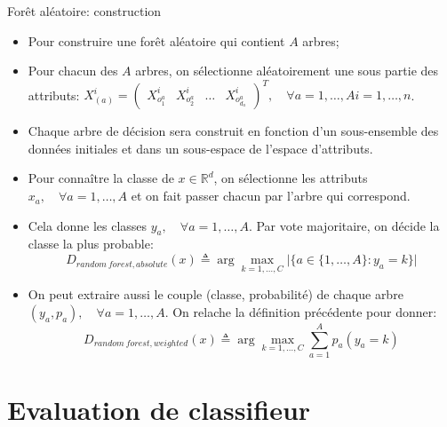 \documentclass[8pt]{beamer}
\begin{document}
				\begin{frame}{Forêt aléatoire: construction}
					\begin{itemize}
						\item<1-> Pour construire une forêt aléatoire qui contient \(A\) arbres;
						\item<2-> Pour chacun des \(A\) arbres, on sélectionne aléatoirement une sous partie des attributs: \(X^i_{(a)} = \begin{pmatrix}
							X^i_{o^a_1} & X^i_{o^a_2} & \dots & X^i_{o^a_{d_a}}
						\end{pmatrix}^T, \quad \forall a = 1,\dots,A  i=1,\dots,n\).
						\item<3-> Chaque arbre de décision sera construit en fonction d'un sous-ensemble des données initiales et dans un sous-espace de l'espace d'attributs.
						\item<4-> Pour connaître la classe de \(x \in \mathbb{R}^d\), on sélectionne les attributs \(x_a, \quad \forall a = 1,\dots,A\) et on fait passer chacun par l'arbre qui correspond.
						\item<5-> Cela donne les classes \(y_a, \quad \forall a = 1,\dots,A\). Par vote majoritaire, on décide la classe la plus probable:
							\begin{equation}
								D_{random\ forest, absolute} (x) \triangleq \arg \max_{k=1,\dots,C} \vert \{a \in \{1,\dots,A\}: y_a = k\} \vert
							\end{equation}
						\item<6-> On peut extraire aussi le couple (classe, probabilité) de chaque arbre \((y_a, p_a), \quad \forall a = 1,\dots,A\). On relache la définition précédente pour donner:
							\begin{equation}
								D_{random\ forest, weighted} (x) \triangleq \arg \max_{k=1,\dots,C} \sum_{a=1}^{A} p_a(y_a = k)
							\end{equation}
					\end{itemize}
				\end{frame}
	
	\section{Evaluation de classifieur}
\end{document}
